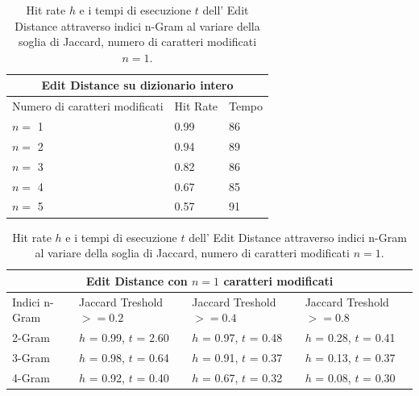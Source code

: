 \documentclass{article}
\begin{document}
\begin{table}[h]
    \centering
    \begin{tabular}{|p{3cm}||p{3cm}|p{3cm}|}
        \hline
        \multicolumn{3}{|c|}{Edit Distance su dizionario intero} \\
        \hline
        Numero di caratteri modificati &Hit Rate& Tempo \\
        \hline
        $n = $ 1 & 0.99 & 86 \\                                            
        $n = $ 2 & 0.94 & 89  \\                                                 
        $n = $ 3 & 0.82  & 86 \\                                                
        $n = $ 4 & 0.67  & 85 \\                                     
        $n = $ 5 & 0.57  & 91 \\                                                        \hline
    \end{tabular}
    \caption{Hit rate e tempo di esecuzione(s) dell'Edit Distance sul dizionario completo al variare del numero di caratteri modificati $n$.}
    \label{tab:my_label}
\medskip
\medskip
\medskip

\centering
\begin{tabular}{ |p{3cm}||p{3cm}|p{3cm}|p{3cm}|  }
 \hline
 \multicolumn{4}{|c|}{Edit Distance con $n = 1$ caratteri modificati} \\
 \hline
Indici n-Gram&Jaccard Treshold $>=0.2$ &Jaccard Treshold $>=0.4$&Jaccard Treshold $>=0.8$ \\
 \hline
 2-Gram   & $h$ = 0.99, $t$ = 2.60    &$h$ = 0.97, $t$ = 0.48 &   $h$ = 0.28, $t$ = 0.41\\
 3-Gram &  $h$ = 0.98, $t$ = 0.64  & $h$ = 0.91, $t$ = 0.37   &$h$ = 0.13, $t$ = 0.37\\
 4-Gram &$h$ = 0.92, $t$ = 0.40 & $h$ = 0.67, $t$ = 0.32 &  $h$ = 0.08, $t$ = 0.30\\
 \hline
\end{tabular}
\caption{Hit rate $h$ e i tempi di esecuzione $t$ dell' Edit Distance attraverso indici n-Gram al variare della soglia di Jaccard, numero di caratteri modificati $n = 1$.}
\end{table}

\makeatletter
\setlength{\@fptop}{0pt}
\makeatother
\end{document}
